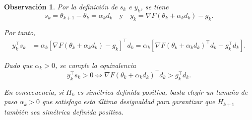\documentclass[a4paper,openany,oneside,10pt]{report}
\theoremstyle{pnlTeorema}
\theoremstyle{pnlDefinicion}
\theoremstyle{pnlObservacion}
\newtheorem{observacion}{Observación}[section]
\begin{document}
\begin{observacion}
\label{obs:curvatura-bfgs}
Por la definición de $s_k$ e $y_k$, se tiene
\[
    s_k=\theta_{k+1}-\theta_k=\alpha_k d_k \quad \text{y} \quad y_k=\nabla F(\theta_k+\alpha_k d_k)-g_k.
\]

Por tanto,
\begin{align*}
    y_k^\top s_k
    &=\alpha_k
    \left[\nabla F(\theta_k+\alpha_k d_k)-g_k\right]^\top d_k=\alpha_k\left[
    \nabla F(\theta_k+\alpha_k d_k)^\top d_k
    -g_k^\top d_k
    \right].
\end{align*}

Dado que $\alpha_k>0$, se cumple la equivalencia
\[
    \boxed{
    y_k^\top s_k>0
    \iff
    \nabla F(\theta_k+\alpha_k d_k)^\top d_k
    >g_k^\top d_k.
    }
\]

En consecuencia, si $H_k$ es simétrica definida positiva,
basta elegir un tamaño de paso $\alpha_k>0$ que satisfaga
esta última desigualdad para garantizar que $H_{k+1}$
también sea simétrica definida positiva.
\end{observacion}
\end{document}
